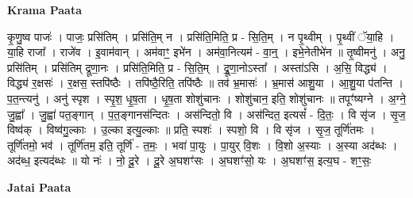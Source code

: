 \documentclass[17pt]{extarticle}
\begin{document}
\textbf{Krama Paata} \newline

कृ॒णु॒ष्व पाजः॑ । पाजः॒ प्रसि॑तिम् । प्रसि॑ति॒म् न । प्रसि॑ति॒मिति॒ प्र - सि॒ति॒म् । न पृ॒थ्वीम् । पृ॒थ्वीं ॅया॒हि । या॒हि राजा᳚ । राजे॑व । इ॒वाम॑वान् । अम॑वाꣳ॒॒ इभे॑न । अम॑वा॒नित्यम॑ - वा॒न्॒ । इभे॒नेतीभे॑न ॥ तृ॒ष्वीमनु॑ । अनु॒ प्रसि॑तिम् । प्रसि॑तिम् द्रूणा॒नः । प्रसि॑ति॒मिति॒ प्र - सि॒ति॒म् । द्रू॒णा॒नोऽस्ता᳚ । अस्ता॑ऽसि । अ॒सि॒ विद्ध्य॑ । विद्ध्य॑ र॒क्षसः॑ । र॒क्षस॒ स्तपि॑ष्ठैः । तपि॑ष्ठै॒रिति॒ तपि॑ष्ठैः ॥ तव॑ भ्र॒मासः॑ । भ्र॒मास॑ आशु॒या । आ॒शु॒या प॑तन्ति । प॒त॒न्त्यनु॑ । अनु॑ स्पृश । स्पृ॒श॒ धृ॒ष॒ता । धृ॒ष॒ता शोशु॑चानः । शोशु॑चान॒ इति॒ शोशु॑चानः ॥ तपूꣳ॑ष्यग्ने । अ॒ग्ने॒ जु॒ह्वा᳚ । जु॒ह्वा॑ पत॒ङ्गान् । प॒त॒ङ्गानस॑न्दितः । अस॑न्दितो॒ वि । अस॑न्दित॒ इत्यसं᳚ - दि॒तः॒ । वि सृ॑ज । सृ॒ज॒ विष्व॑क् । विष्व॑गु॒ल्काः । उ॒ल्का इत्यु॒ल्काः ॥ प्रति॒ स्पशः॑ । स्पशो॒ वि । वि सृ॑ज । सृ॒ज॒ तूर्णि॑तमः । तूर्णि॑तमो॒ भव॑ । तूर्णि॑तम॒ इति॒ तूर्णि॑ - त॒मः॒ । भवा॑ पा॒युः । पा॒युर् वि॒शः । वि॒शो अ॒स्याः । अ॒स्या अद॑ब्धः । अद॑ब्ध॒ इत्यद॑ब्धः ॥ यो नः॑ । नो॒ दू॒रे । दू॒रे अ॒घशꣳ॑सः । अ॒घशꣳ॑सो॒ यः । अ॒घशꣳ॑स॒ इत्य॒घ - शꣳ॒॒सः॒ \newline

\textbf{Jatai Paata} \newline
\end{document}
